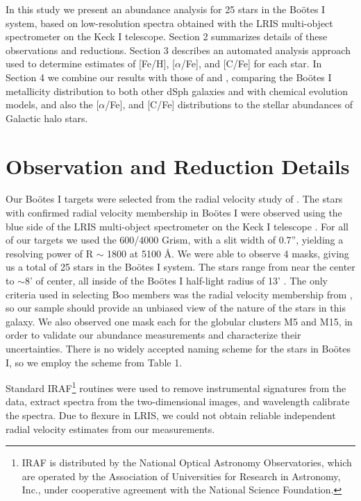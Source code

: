 \documentclass[iop]{emulateapj}
\def\bootes{Bo\"{o}tes I}
\begin{document}
In this study we present an abundance analysis for 25 stars in the
\bootes{} system, based on low-resolution spectra obtained with the
LRIS multi-object spectrometer on the Keck I telescope. Section 2
summarizes details of these observations and reductions. Section 3
describes an automated analysis approach used to determine estimates
of [Fe/H], [$\alpha$/Fe], and [C/Fe] for each star. In Section 4 we
combine our results with those of \citet{feltzing09} and
\citet{norris10b}, comparing the \bootes{} metallicity distribution to
both other dSph galaxies and with chemical evolution models, and also
the [$\alpha$/Fe], and [C/Fe] distributions to the stellar abundances
of Galactic halo stars.

\section{Observation and Reduction Details}

Our \bootes{} targets were selected from the radial velocity study of
\citet{martin07}. The stars with confirmed radial velocity membership
in \bootes{} were observed using the blue side of the LRIS
multi-object spectrometer on the Keck I telescope
\citep{oke95,steidel04}. For all of our targets we used the 600/4000
Grism, with a slit width of 0.7'', yielding a resolving power of R
$\sim$ 1800 at 5100 \AA{}. We were able to observe 4 masks, giving us
a total of 25 stars in the \bootes{} system. The stars range from near
the center to $\sim8$' of center, all inside of the \bootes{} half-light
radius of 13' \citep{bootesI}. The only criteria used in
selecting Boo members was the radial velocity membership from
\citet{martin07}, so our sample should provide an unbiased view of the
nature of the stars in this galaxy. We also observed one mask each
for the globular clusters M5 and M15, in order to validate our
abundance measurements and characterize their uncertainties. There is
no widely accepted naming scheme for the stars in \bootes{}, so we
employ the scheme from Table 1.

Standard IRAF\footnote{IRAF is distributed by the National Optical Astronomy Observatories,
    which are operated by the Association of Universities for Research
    in Astronomy, Inc., under cooperative agreement with the National
    Science Foundation.} routines were used to remove instrumental signatures from the data, extract 
spectra from the two-dimensional images, and wavelength calibrate the spectra.  
Due to flexure in LRIS, we could not obtain reliable independent radial
velocity estimates from our measurements.
\end{document}
